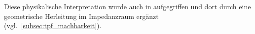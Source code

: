 Diese physikalische Interpretation wurde auch in \cite{Salazar2024} aufgegriffen und dort durch eine geometrische Herleitung im Impedanzraum ergänzt (vgl.\ \cref{subsec:tpf_machbarkeit}).

%
%
%
%

